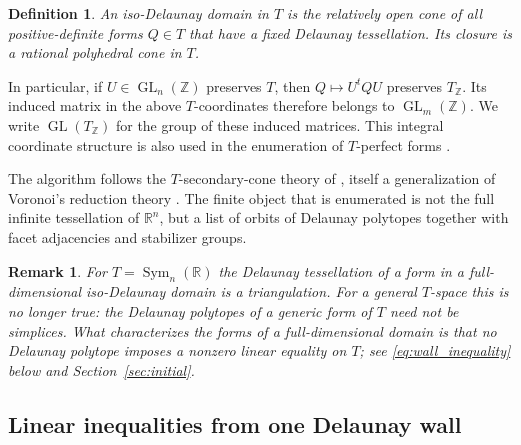 \documentclass{amsart}
\newtheorem{definition}{Definition}
\newtheorem{remark}{Remark}
\newcommand{\Sym}{\operatorname{Sym}}
\newcommand{\GL}{\operatorname{GL}}
\newcommand{\ZZ}{\mathbb{Z}}
\newcommand{\RR}{\mathbb{R}}
\begin{document}
\begin{definition}
An iso-Delaunay domain in \(T\) is the relatively open cone of all
positive-definite forms \(Q\in T\) that have a fixed Delaunay tessellation.
Its closure is a rational polyhedral cone in \(T\).
\end{definition}

In particular, if \(U\in\GL_n(\ZZ)\) preserves \(T\), then
\(Q\mapsto U^tQU\) preserves \(T_{\ZZ}\).  Its induced matrix in the above
\(T\)-coordinates therefore belongs to \(\GL_m(\ZZ)\).  We write
\(\GL(T_{\ZZ})\) for the group of these induced matrices.  This integral
coordinate structure is also used in the enumeration of \(T\)-perfect forms
\cite{Schuermann2009}.

The algorithm follows the \(T\)-secondary-cone theory of
\cite{DutourSikiriSchurmannVallentin2008}, itself a generalization of
Voronoi's reduction theory \cite{Voronoi1908}.  The finite object that is
enumerated is not the full infinite tessellation of \(\RR^n\), but a list of
orbits of Delaunay polytopes together with facet adjacencies and stabilizer
groups.

\begin{remark}\label{rem:non_simplicial}
For \(T=\Sym_n(\RR)\) the Delaunay tessellation of a form in a
full-dimensional iso-Delaunay domain is a triangulation.  For a general
\(T\)-space this is no longer true: the Delaunay polytopes of a generic form of
\(T\) need not be simplices.  What characterizes the forms of a
full-dimensional domain is that no Delaunay polytope imposes a nonzero linear
equality on \(T\); see \eqref{eq:wall_inequality} below and
Section~\ref{sec:initial}.
\end{remark}

\subsection{Linear inequalities from one Delaunay wall}
\end{document}
